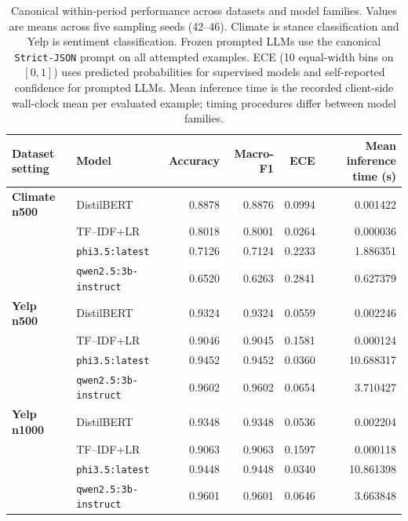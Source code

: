 \begin{table}[t]
\centering
\small
\caption{Canonical within-period performance across datasets and model families. Values are means across five sampling seeds (42--46). Climate is stance classification and Yelp is sentiment classification. Frozen prompted LLMs use the canonical \texttt{Strict-JSON} prompt on all attempted examples. ECE (10 equal-width bins on $[0, 1]$) uses predicted probabilities for supervised models and self-reported confidence for prompted LLMs. Mean inference time is the recorded client-side wall-clock mean per evaluated example; timing procedures differ between model families.}
\label{tab:canonical-performance}
\begin{tabular}{llrrrr}
\toprule
\textbf{Dataset setting} & \textbf{Model} & \textbf{Accuracy} & \textbf{Macro-F1} & \textbf{ECE} & \textbf{Mean inference time (s)} \\
\midrule
\textbf{Climate n500} & DistilBERT & 0.8878 & 0.8876 & 0.0994 & 0.001422 \\
 & TF--IDF+LR & 0.8018 & 0.8001 & 0.0264 & 0.000036 \\
 & \texttt{phi3.5:latest} & 0.7126 & 0.7124 & 0.2233 & 1.886351 \\
 & \texttt{qwen2.5:3b-instruct} & 0.6520 & 0.6263 & 0.2841 & 0.627379 \\
\midrule
\textbf{Yelp n500} & DistilBERT & 0.9324 & 0.9324 & 0.0559 & 0.002246 \\
 & TF--IDF+LR & 0.9046 & 0.9045 & 0.1581 & 0.000124 \\
 & \texttt{phi3.5:latest} & 0.9452 & 0.9452 & 0.0360 & 10.688317 \\
 & \texttt{qwen2.5:3b-instruct} & 0.9602 & 0.9602 & 0.0654 & 3.710427 \\
\midrule
\textbf{Yelp n1000} & DistilBERT & 0.9348 & 0.9348 & 0.0536 & 0.002204 \\
 & TF--IDF+LR & 0.9063 & 0.9063 & 0.1597 & 0.000118 \\
 & \texttt{phi3.5:latest} & 0.9448 & 0.9448 & 0.0340 & 10.861398 \\
 & \texttt{qwen2.5:3b-instruct} & 0.9601 & 0.9601 & 0.0646 & 3.663848 \\
\bottomrule
\end{tabular}
\end{table}
